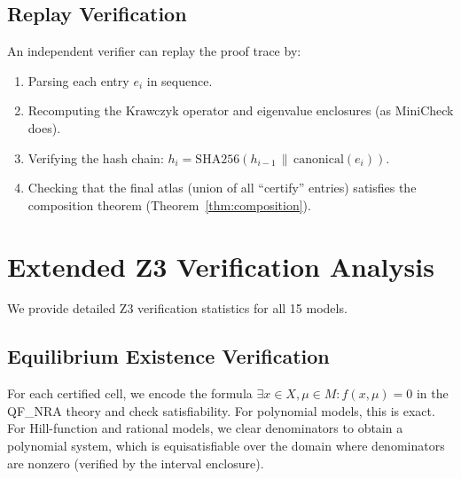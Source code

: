 \documentclass[11pt]{article}
\begin{document}
\subsection{Replay Verification}

An independent verifier can replay the proof trace by:
\begin{enumerate}
\item Parsing each entry $e_i$ in sequence.
\item Recomputing the Krawczyk operator and eigenvalue enclosures (as MiniCheck does).
\item Verifying the hash chain: $h_i = \mathrm{SHA256}(h_{i-1} \,\|\, \mathrm{canonical}(e_i))$.
\item Checking that the final atlas (union of all ``certify'' entries) satisfies the composition theorem (Theorem~\ref{thm:composition}).
\end{enumerate}

\section{Extended Z3 Verification Analysis}
\label{app:z3-extended}

We provide detailed Z3 verification statistics for all 15 models.

\subsection{Equilibrium Existence Verification}

For each certified cell, we encode the formula $\exists x \in X, \mu \in M : f(x, \mu) = 0$ in the QF\_NRA theory and check satisfiability.
For polynomial models, this is exact.
For Hill-function and rational models, we clear denominators to obtain a polynomial system, which is equisatisfiable over the domain where denominators are nonzero (verified by the interval enclosure).
\end{document}
